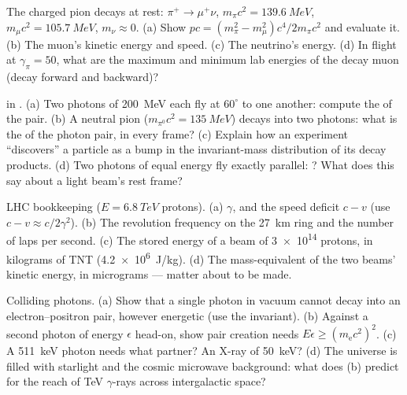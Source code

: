 \begin{exercise}[$\star\star$]\label{exo:b3:relativistic-dynamics:6}
The charged pion decays at rest: $\pi^+ \to \mu^+\nu$, $m_\pi c^2 =
\qty{139.6}{MeV}$, $m_\mu c^2 = \qty{105.7}{MeV}$, $m_\nu \approx 0$.
(a) Show $pc = (m_\pi^2 - m_\mu^2)c^4/2m_\pi c^2$ and evaluate it.
(b) The muon's kinetic energy and speed. (c) The neutrino's energy.
(d) In flight at $\gamma_\pi = 50$, what are the maximum and minimum
lab energies of the decay muon (decay forward and backward)?
\end{exercise}

\begin{exercise}[$\star\star$]\label{exo:b3:relativistic-dynamics:7}
 in . (a) Two photons of \qty{200}{MeV} each fly
at $60^\circ$ to one another: compute the  of the pair.
(b) A neutral pion ($m_{\pi^0}c^2 = \qty{135}{MeV}$) decays into two
photons: what is the  of the photon pair, in every
frame? (c) Explain how an experiment ``discovers'' a particle as a
bump in the invariant-mass distribution of its decay products. (d)
Two photons of equal energy fly exactly parallel: ?
What does this say about a light beam's rest frame?
\end{exercise}

\begin{exercise}[$\star\star$]\label{exo:b3:relativistic-dynamics:8}
LHC bookkeeping ($E = \qty{6.8}{TeV}$ protons). (a) $\gamma$, and the
speed deficit $c - v$ (use $c - v \approx c/2\gamma^2$). (b) The
revolution frequency on the \qty{27}{km} ring and the number of laps
per second. (c) The stored energy of a beam of \num{3e14} protons, in
kilograms of TNT (\qty{4.2e6}{J/kg}). (d) The mass-equivalent of the
two beams' kinetic energy, in micrograms --- matter about to be made.
\end{exercise}

\begin{exercise}[$\star\star$]\label{exo:b3:relativistic-dynamics:9}
Colliding photons. (a) Show that a single photon in vacuum cannot
decay into an electron--positron pair, however energetic (use the
invariant). (b) Against a second photon of energy $\epsilon$ head-on,
show pair creation needs $E\epsilon \ge (m_{\text{e}}c^2)^2$. (c) A
\qty{511}{keV} photon needs what partner? An X-ray of \qty{50}{keV}?
(d) The universe is filled with starlight and the cosmic microwave
background: what does (b) predict for the reach of TeV $\gamma$-rays
across intergalactic space?
\end{exercise}

